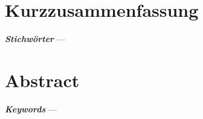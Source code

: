 \chapter{Kurzzusammenfassung}

\theAbstractGer

\vfill

\noindent\textbf{\textit{Stichwörter}} --- \theKeywordsGer

\chapter{Abstract}

\theAbstractEng

\vfill

\noindent\textbf{\textit{Keywords}} --- \theKeywordsEng